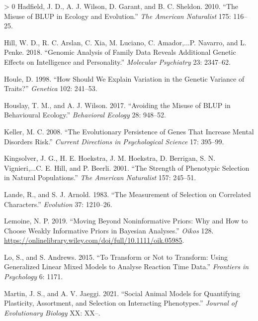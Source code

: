 \documentclass{article}
\newlength{\cslhangindent}
\newenvironment{CSLReferences}[3] %
 {%
  \setlength{\parindent}{0pt}
  \ifodd #1 \everypar{\setlength{\hangindent}{\cslhangindent}}\ignorespaces\fi
  \ifnum #2 > 0
  \setlength{\parskip}{#2\baselineskip}
  \fi
 }%
 {}
\begin{document}
\begin{CSLReferences}{1}{0}
\leavevmode\hypertarget{ref-Hadfield2010}{}%
Hadfield, J. D., A. J. Wilson, D. Garant, and B. C. Sheldon. 2010.
{``The Misuse of BLUP in Ecology and Evolution.''} \emph{The American
Naturalist} 175: 116--25.

\leavevmode\hypertarget{ref-Hill2018}{}%
Hill, W. D., R. C. Arslan, C. Xia, M. Luciano, C. Amador,...P. Navarro,
and L. Penke. 2018. {``Genomic Analysis of Family Data Reveals
Additional Genetic Effects on Intelligence and Personality.''}
\emph{Molecular Psychiatry} 23: 2347--62.

\leavevmode\hypertarget{ref-Houle1998}{}%
Houle, D. 1998. {``How Should We Explain Variation in the Genetic
Variance of Traits?''} \emph{Genetica} 102: 241--53.

\leavevmode\hypertarget{ref-Hous2017}{}%
Houslay, T. M., and A. J. Wilson. 2017. {``Avoiding the Misuse of BLUP
in Behavioural Ecology.''} \emph{Behavioral Ecology} 28: 948--52.

\leavevmode\hypertarget{ref-Keller2008}{}%
Keller, M. C. 2008. {``The Evolutionary Persistence of Genes That
Increase Mental Disorders Risk.''} \emph{Current Directions in
Psychological Science} 17: 395--99.

\leavevmode\hypertarget{ref-Kingsolver2001}{}%
Kingsolver, J. G., H. E. Hoekstra, J. M. Hoekstra, D. Berrigan, S. N.
Vignieri,...C. E. Hill, and P. Beerli. 2001. {``The Strength of
Phenotypic Selection in Natural Populations.''} \emph{The American
Naturalist} 157: 245--51.

\leavevmode\hypertarget{ref-Lande1983}{}%
Lande, R., and S. J. Arnold. 1983. {``The Measurement of Selection on
Correlated Characters.''} \emph{Evolution} 37: 1210--26.

\leavevmode\hypertarget{ref-Lemoine2019}{}%
Lemoine, N. P. 2019. {``Moving Beyond Noninformative Priors: Why and How
to Choose Weakly Informative Priors in Bayesian Analyses.''}
\emph{Oikos} 128.
\url{https://onlinelibrary.wiley.com/doi/full/10.1111/oik.05985}.

\leavevmode\hypertarget{ref-Lo2015}{}%
Lo, S., and S. Andrews. 2015. {``To Transform or Not to Transform: Using
Generalized Linear Mixed Models to Analyse Reaction Time Data.''}
\emph{Frontiers in Psychology} 6: 1171.

\leavevmode\hypertarget{ref-Martin2021}{}%
Martin, J. S., and A. V. Jaeggi. 2021. {``Social Animal Models for
Quantifying Plasticity, Assortment, and Selection on Interacting
Phenotypes.''} \emph{Journal of Evolutionary Biology} XX: XX--.


\end{CSLReferences}
\end{document}
